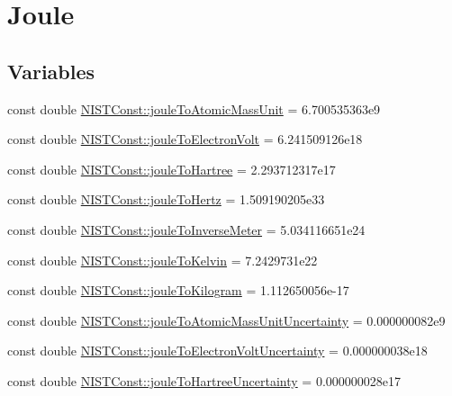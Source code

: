 \hypertarget{group___n_i_s_t_const-_joule}{}\section{Joule}
\label{group___n_i_s_t_const-_joule}
\subsection*{Variables}
\begin{DoxyCompactItemize}
\item 
const double \hyperlink{group___n_i_s_t_const-_joule_ga6a8cba6b834ee62ab61671208b1ae9ee}{N\+I\+S\+T\+Const\+::joule\+To\+Atomic\+Mass\+Unit} = 6.\+700535363e9
\item 
const double \hyperlink{group___n_i_s_t_const-_joule_ga08ffcdfd701ba898a91b0cbdde4d0e2d}{N\+I\+S\+T\+Const\+::joule\+To\+Electron\+Volt} = 6.\+241509126e18
\item 
const double \hyperlink{group___n_i_s_t_const-_joule_gac067d2d31bf56c3abe63559dac6c00d7}{N\+I\+S\+T\+Const\+::joule\+To\+Hartree} = 2.\+293712317e17
\item 
const double \hyperlink{group___n_i_s_t_const-_joule_ga6ac361417bc6b472bf80fcfef276d742}{N\+I\+S\+T\+Const\+::joule\+To\+Hertz} = 1.\+509190205e33
\item 
const double \hyperlink{group___n_i_s_t_const-_joule_gaa8de9ad07a642c1b9c1d4ee15125a917}{N\+I\+S\+T\+Const\+::joule\+To\+Inverse\+Meter} = 5.\+034116651e24
\item 
const double \hyperlink{group___n_i_s_t_const-_joule_ga506f23a4b88678bd7ee6f1067e97aa83}{N\+I\+S\+T\+Const\+::joule\+To\+Kelvin} = 7.\+2429731e22
\item 
const double \hyperlink{group___n_i_s_t_const-_joule_ga250f161277a6e581e695dccb7c11d1fb}{N\+I\+S\+T\+Const\+::joule\+To\+Kilogram} = 1.\+112650056e-\/17
\item 
const double \hyperlink{group___n_i_s_t_const-_joule_ga0fcd1cd8572c48695fadec809a5a1225}{N\+I\+S\+T\+Const\+::joule\+To\+Atomic\+Mass\+Unit\+Uncertainty} = 0.\+000000082e9
\item 
const double \hyperlink{group___n_i_s_t_const-_joule_ga36506e3cfb40cd74646e95340c9c4721}{N\+I\+S\+T\+Const\+::joule\+To\+Electron\+Volt\+Uncertainty} = 0.\+000000038e18
\item 
const double \hyperlink{group___n_i_s_t_const-_joule_ga503d276676014580036110b6554bd974}{N\+I\+S\+T\+Const\+::joule\+To\+Hartree\+Uncertainty} = 0.\+000000028e17
\item 

\end{DoxyCompactItemize}
